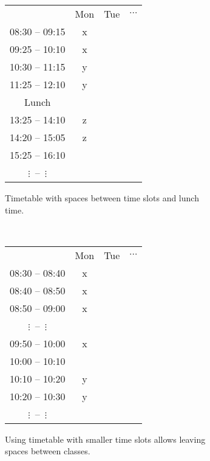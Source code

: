 \documentclass[ThesisDoc]{subfiles}
\begin{document}
\begin{figure}[h]
  \begin{subfigure}[b]{.5\textwidth}
    \centering
    \begin{tabular}{|c||c|c|c|}
      \hline & Mon & Tue & $\cdots$ \\
      \hhline{|=#=|=|=|}
      08:30 -- 09:15 & x & & \\\hline
      09:25 -- 10:10 & x & & \\\hline
      10:30 -- 11:15 & y & & \\\hline
      11:25 -- 12:10 & y & & \\\hline
      Lunch          &   & & \\\hline
      13:25 -- 14:10 & z & & \\\hline
      14:20 -- 15:05 & z & & \\\hline
      15:25 -- 16:10 &   & & \\\hline
      $\vdots$\quad~--~\quad$\vdots$ & & & \\\hline
    \end{tabular}
    \caption{Timetable with spaces between time slots and lunch time.}
    \label{fig:timetable-intervals-predef}
  \end{subfigure}
  ~
  \begin{subfigure}[b]{.5\textwidth}
    \centering
    \begin{tabular}{|c||c|c|c|}
      \hline & Mon & Tue & $\cdots$ \\
      \hhline{|=#=|=|=|}
      08:30 -- 08:40 & x & & \\\hline
      08:40 -- 08:50 & x & & \\\hline
      08:50 -- 09:00 & x & & \\\hline
      $\vdots$\quad~--~\quad$\vdots$ & & & \\\hline
      09:50 -- 10:00 & x & & \\\hline
      10:00 -- 10:10 &   & & \\\hline
      10:10 -- 10:20 & y & & \\\hline
      10:20 -- 10:30 & y & & \\\hline
      $\vdots$\quad~--~\quad$\vdots$ & & & \\\hline
    \end{tabular}
    \caption{Using timetable with smaller time slots allows leaving spaces
             between classes.}
    \label{fig:timetable-intervals-any}
  \end{subfigure}
  \caption{}
\end{figure}
\end{document}
